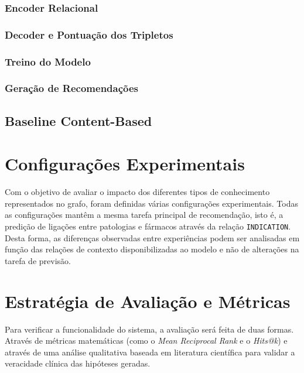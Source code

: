 \subsubsection{Encoder Relacional}
\label{subsubsec:encoder-relacional}


\subsubsection{Decoder e Pontuação dos Tripletos}
\label{subsubsec:decoder-pontuacao}

\subsubsection{Treino do Modelo}
\label{subsubsec:treino-rgcn}

\subsubsection{Geração de Recomendações}
\label{subsubsec:geracao-recomendacoes-rgcn}

\subsection{Baseline Content-Based}
\label{subsec:baseline-content-based}

\section{Configurações Experimentais}
\label{subsec:configuracoes-experimentais}
Com o objetivo de avaliar o impacto dos diferentes tipos de conhecimento representados no grafo, foram definidas várias configurações experimentais. Todas as configurações mantêm a mesma tarefa principal de recomendação, isto é, a predição de ligações entre patologias e fármacos através da relação \texttt{INDICATION}. Desta forma, as diferenças observadas entre experiências podem ser analisadas em função das relações de contexto disponibilizadas ao modelo e não de alterações na tarefa de previsão.


\section{Estratégia de Avaliação e Métricas}
\label{sec:avaliacao e metrica}
Para verificar a funcionalidade do sistema, a avaliação será feita de duas formas. Através de métricas matemáticas (como o \emph{Mean Reciprocal Rank} e o \emph{Hits@k}) e através de uma análise qualitativa baseada em literatura científica para validar a veracidade clínica das hipóteses geradas.


